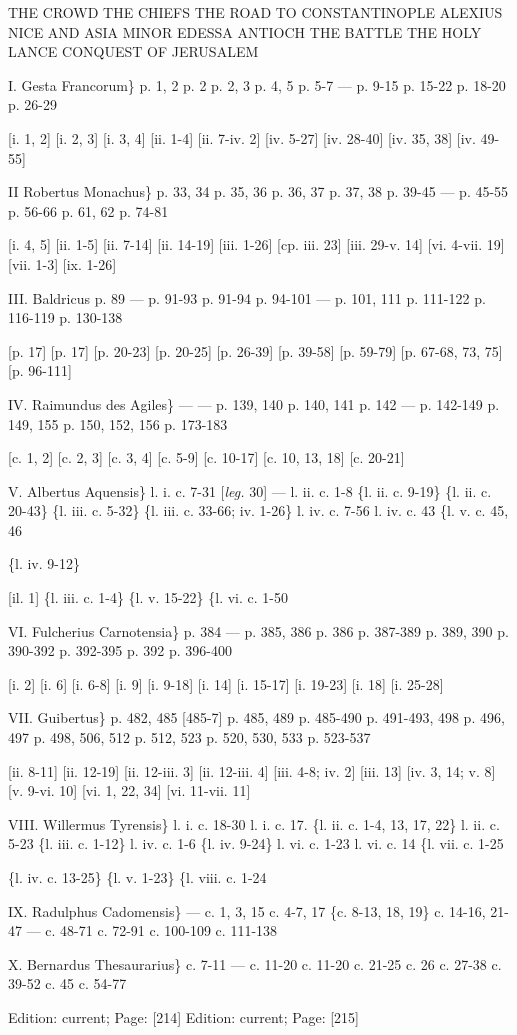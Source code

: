 {THE CROWD
THE CHIEFS
THE ROAD TO CONSTANTINOPLE
ALEXIUS
NICE AND ASIA MINOR
EDESSA
ANTIOCH
THE BATTLE
THE HOLY LANCE
CONQUEST OF JERUSALEM

I. Gesta Francorum\}
p. 1, 2
p. 2
p. 2, 3
p. 4, 5
p. 5-7
\texthebrew{—
}p. 9-15
p. 15-22
p. 18-20
p. 26-29

[i. 1, 2]
[i. 2, 3]
[i. 3, 4]
[ii. 1-4]
[ii. 7-iv. 2]
[iv. 5-27]
[iv. 28-40]
[iv. 35, 38]
[iv. 49-55]

II Robertus Monachus\}
p. 33, 34
p. 35, 36
p. 36, 37
p. 37, 38
p. 39-45
\texthebrew{—
}p. 45-55
p. 56-66
p. 61, 62
p. 74-81

[i. 4, 5]
[ii. 1-5]
[ii. 7-14]
[ii. 14-19]
[iii. 1-26]
[cp. iii. 23]
[iii. 29-v. 14]
[vi. 4-vii. 19]
[vii. 1-3]
[ix. 1-26]

III. Baldricus
p. 89
\texthebrew{—
}p. 91-93
p. 91-94
p. 94-101
\texthebrew{—
}p. 101, 111
p. 111-122
p. 116-119
p. 130-138

[p. 17]
[p. 17]
[p. 20-23]
[p. 20-25]
[p. 26-39]
[p. 39-58]
[p. 59-79]
[p. 67-68, 73, 75]
[p. 96-111]

IV. Raimundus des Agiles\}
\texthebrew{—
—
}p. 139, 140
p. 140, 141
p. 142
\texthebrew{—
}p. 142-149
p. 149, 155
p. 150, 152, 156
p. 173-183

[c. 1, 2]
[c. 2, 3]
[c. 3, 4]
[c. 5-9]
[c. 10-17]
[c. 10, 13, 18]
[c. 20-21]

V. Albertus Aquensis\}
l. i. c. 7-31 [\emph{leg.} 30]
\texthebrew{—
}l. ii. c. 1-8
\{l. ii. c. 9-19\}
\{l. ii. c. 20-43\}
\{l. iii. c. 5-32\}
\{l. iii. c. 33-66; iv. 1-26\}
l. iv. c. 7-56
l. iv. c. 43
\{l. v. c. 45, 46

\{l. iv. 9-12\}

[il. 1]
\{l. iii. c. 1-4\}
\{l. v. 15-22\}
\{l. vi. c. 1-50

VI. Fulcherius Carnotensia\}
p. 384
\texthebrew{—
}p. 385, 386
p. 386
p. 387-389
p. 389, 390
p. 390-392
p. 392-395
p. 392
p. 396-400

[i. 2]
[i. 6]
[i. 6-8]
[i. 9]
[i. 9-18]
[i. 14]
[i. 15-17]
[i. 19-23]
[i. 18]
[i. 25-28]

VII. Guibertus\}
p. 482, 485
[485-7]
p. 485, 489
p. 485-490
p. 491-493, 498
p. 496, 497
p. 498, 506, 512
p. 512, 523
p. 520, 530, 533
p. 523-537

[ii. 8-11]
[ii. 12-19]
[ii. 12-iii. 3]
[ii. 12-iii. 4]
[iii. 4-8; iv. 2]
[iii. 13]
[iv. 3, 14; v. 8]
[v. 9-vi. 10]
[vi. 1, 22, 34]
[vi. 11-vii. 11]

VIII. Willermus Tyrensis\}
l. i. c. 18-30
l. i. c. 17.
\{l. ii. c. 1-4, 13, 17, 22\}
l. ii. c. 5-23
\{l. iii. c. 1-12\}
l. iv. c. 1-6
\{l. iv. 9-24\}
l. vi. c. 1-23
l. vi. c. 14
\{l. vii. c. 1-25

\{l. iv. c. 13-25\}
\{l. v. 1-23\}
\{l. viii. c. 1-24

IX. Radulphus Cadomensis\}
\texthebrew{—
}c. 1, 3, 15
c. 4-7, 17
\{c. 8-13, 18, 19\}
c. 14-16, 21-47
\texthebrew{—
}c. 48-71
c. 72-91
c. 100-109
c. 111-138

X. Bernardus Thesaurarius\}
c. 7-11
\texthebrew{—
}c. 11-20
c. 11-20
c. 21-25
c. 26
c. 27-38
c. 39-52
c. 45
c. 54-77}
Edition: current; Page: [214]
Edition: current; Page: [215]

